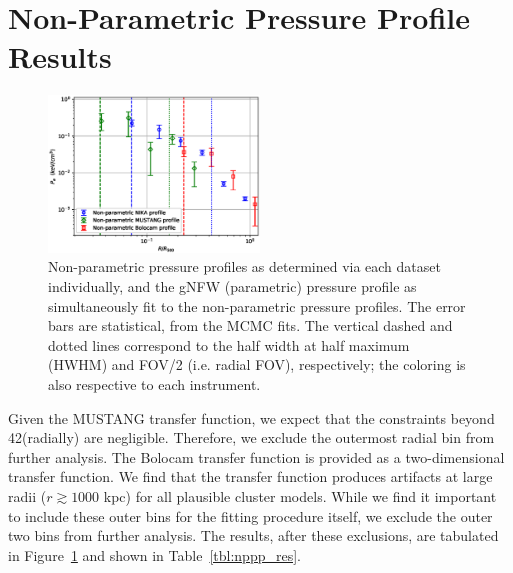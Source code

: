 \documentclass[twocolumn,traditabstract]{aa}
\begin{document}

\section{Non-Parametric Pressure Profile Results}
\label{sec:np_res}

\begin{figure}[!h]
  \centering
  \includegraphics[width=0.5\textwidth]{NIKA_ml_deproj_figs/Real_Joint_gNFW_Power_Real_11011111_2500S_500B_100W_non_parametric_pressure_p16cosmo.eps}
  \caption{Non-parametric pressure profiles as determined via each dataset individually, and the gNFW (parametric)
    pressure profile as simultaneously fit to the non-parametric pressure profiles. The error bars are statistical,
    from the MCMC fits. The vertical dashed and dotted lines correspond to the half width at half maximum (HWHM) and
    FOV/2 (i.e. radial FOV), respectively; the coloring is also respective to each instrument.}
  \label{fig:nppps}
\end{figure}

Given the MUSTANG transfer function, we expect that the constraints beyond 42\asecs (radially) are negligible. Therefore,
we exclude the outermost radial bin from further analysis.
The Bolocam transfer function is provided as a two-dimensional transfer function. We find that the transfer function produces
artifacts at large radii ($r \gtrsim 1000$ kpc) for all plausible cluster models. While we find it important to include these
outer bins for the fitting procedure itself, we exclude the outer two bins from further analysis. The results, after these
exclusions, are tabulated in Figure~\ref{fig:nppps} and shown in Table~\ref{tbl:nppp_res}.
\end{document}
